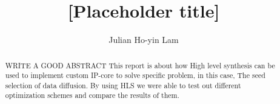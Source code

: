 \documentclass[]{report}
\title{[Placeholder title]}
\author{Julian Ho-yin Lam}
\begin{document}

\setcounter{page}{0}


\begin{abstract}
WRITE A GOOD ABSTRACT
This report is about how High level synthesis can be used to implement custom IP-core to solve specific problem, in this case, The seed selection of data diffusion. By using HLS we were able to test out different optimization schemes and compare the results of them. 



\end{abstract}
\tableofcontents
\listoffigures
\listoftables
\setcounter{page}{0}











\end{document}
